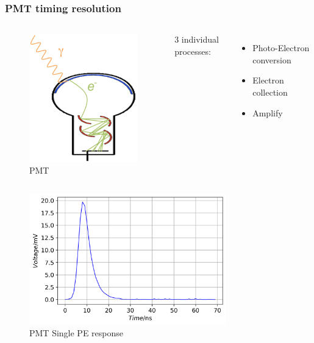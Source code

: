 \documentclass{beamer}
\begin{document}
\begin{frame}
\frametitle{PMT timing resolution}
\setlength{\abovecaptionskip}{-2mm}
\setlength{\belowcaptionskip}{0mm}
\begin{columns}
\begin{figure}
    \centering
    \caption{PMT}
    \includegraphics[width=0.25\linewidth]{img/PMT.png}
\end{figure}
\begin{center}
    3 individual processes:
\end{center}
\vspace{-4mm}
\begin{itemize}
    \item Photo-Electron conversion
    \item Electron collection
    \item Amplify
\end{itemize}
\end{columns}
\begin{columns}
\begin{figure}
    \centering
    \caption{PMT Single PE response}
    \includegraphics[width=1.0\linewidth]{img/pmtspe.png}
\end{figure}
\begin{figure}

\end{figure}
\end{columns}
\end{frame}
\end{document}
